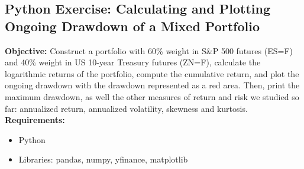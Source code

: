 \documentclass{article}
\begin{document}
\subsection{Python Exercise: Calculating and Plotting Ongoing Drawdown of a Mixed Portfolio}

\textbf{Objective:} Construct a portfolio with 60\% weight in S\&P 500 futures (ES=F) and 40\% weight in US 10-year Treasury futures (ZN=F), calculate the logarithmic returns of the portfolio, compute the cumulative return, and plot the ongoing drawdown with the drawdown represented as a red area. Then, print the maximum drawdown, as well the other measures of return and risk we studied so far: annualized return, annualized volatility, skewness and kurtosis. \\

\textbf{Requirements:}
\begin{itemize}
    \item Python
    \item Libraries: pandas, numpy, yfinance, matplotlib
\end{itemize}
\end{document}
